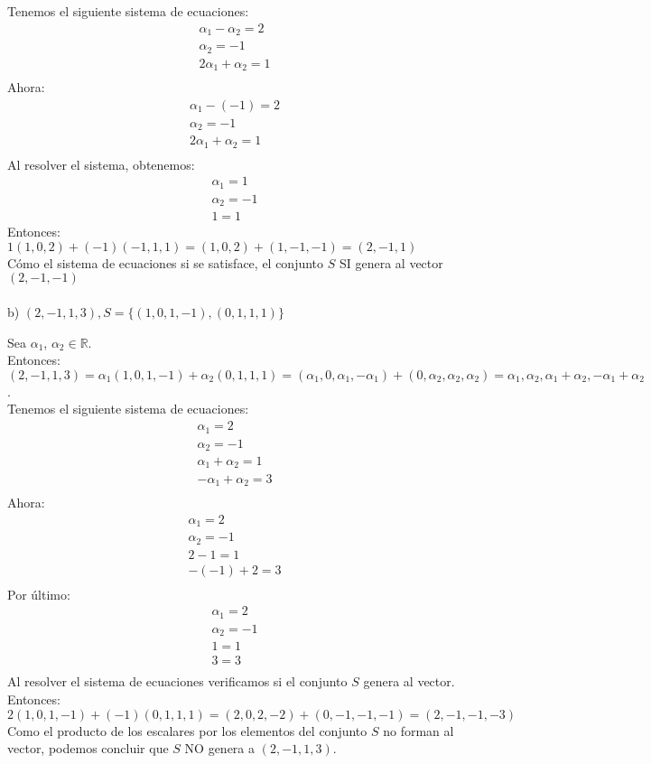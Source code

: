 \documentclass[letterpaper]{article}
\renewcommand{\*}{\cdot}
\theoremstyle{definition}
\begin{document}
Tenemos el siguiente sistema de ecuaciones:
\begin{eqnarray*}
\alpha_{1}-\alpha_{2}= 2 \\
\alpha_{2} = -1\\
2\alpha_{1}+\alpha_{2}=1\\
\end{eqnarray*}
Ahora:
\begin{eqnarray*}
\alpha_{1} -(-1)=2 \\
\alpha_{2}=-1\\
2\alpha_{1} + \alpha_{2} = 1\\
\end{eqnarray*}
Al resolver el sistema, obtenemos:
\begin{eqnarray*}
\alpha_{1}=1 \\
\alpha_{2} = -1 \\
1 = 1
\end{eqnarray*}
Entonces:\\ $1(1,0,2) + (-1)(-1,1,1) = (1,0,2) + (1,-1,-1) = (2,-1,1)$\\
Cómo el sistema de ecuaciones si se satisface, el conjunto $S$ SI genera al vector $(2,-1,-1)$\\ \\

\noindent b) $(2,-1,1,3), S =  \lbrace (1,0,1,-1),(0,1,1,1) \rbrace$

Sea $\alpha _1$, $\alpha _2 \in \mathbb{R}$.\\
Entonces: $(2,-1,1,3)=\alpha_{1}(1,0,1,-1)+\alpha_{2}(0,1,1,1)= (\alpha_{1},0,\alpha_{1},-\alpha_{1})+(0,\alpha_{2},\alpha_{2},\alpha_{2})= \alpha_{1},\alpha_{2},\alpha_{1}+\alpha_{2},-\alpha_{1}+\alpha_{2}$.\\
Tenemos el siguiente sistema de ecuaciones:\\
\begin{eqnarray*}
\alpha_{1}=2\\
\alpha_{2} = -1\\
\alpha_{1}+\alpha_{2}=1\\
-\alpha_{1}+\alpha_{2}=3\\
\end{eqnarray*}
Ahora:\\
\begin{eqnarray*}
\alpha_{1}=2\\
\alpha_{2}= -1\\
2-1  =1\\
-(-1)+2 = 3\\
\end{eqnarray*}
Por último:
\begin{eqnarray*}
\alpha_{1}=2\\
\alpha_{2}=-1\\
1=1\\
3=3\\
\end{eqnarray*}
Al resolver el sistema de ecuaciones verificamos si el conjunto $S$ genera al vector. Entonces:
\[2(1,0,1,-1)+(-1)(0,1,1,1)=(2,0,2,-2)+(0,-1,-1,-1)=(2,-1,-1,-3)\]
Como el producto de los escalares por los elementos del conjunto $S$ no forman al vector, podemos concluir que $S$ NO genera a $(2,-1,1,3)$.\\
\end{document}
